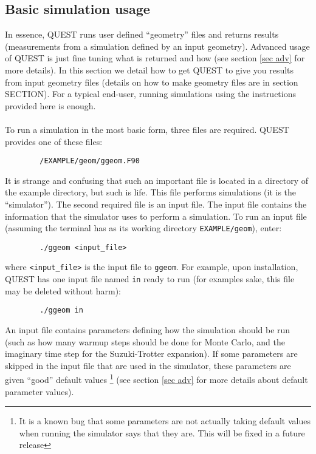 \documentclass[12pt]{article}
\begin{document}
    \subsection{Basic simulation usage}\label{sec basic sim use}
        In essence, QUEST runs user defined ``geometry'' files and returns results (measurements from a simulation defined by an input geometry).
        Advanced usage of QUEST is just fine tuning what is returned and how (see section \ref{sec adv} for more details).
        In this section we detail how to get QUEST to give you results from input geometry files (details on how to make geometry files are in section SECTION). 
        For a typical end-user, running simulations using the instructions provided here is enough. \\
        \\
        \noindent To run a simulation in the most basic form, three files are required.
        QUEST provides one of these files:
        \begin{verbatim}
        /EXAMPLE/geom/ggeom.F90
        \end{verbatim}
        It is strange and confusing that such an important file is located in a directory of the example directory, but such is life.
        This file performs simulations (it is the ``simulator'').
        The second required file is an input file.
        The input file contains the information that the simulator uses to perform a simulation.
        To run an input file (assuming the terminal has as its working directory \texttt{EXAMPLE/geom}), enter:
        \begin{verbatim}
        ./ggeom <input_file>
        \end{verbatim}
        where \texttt{<input\_file>} is the input file to \texttt{ggeom}.
        For example, upon installation, QUEST has one input file named \texttt{in} ready to run (for examples sake, this file may be deleted without harm):
        \begin{verbatim}
        ./ggeom in
        \end{verbatim}
        An input file contains parameters defining how the simulation should be run (such as how many warmup steps should be done for Monte Carlo, and the imaginary time step for the Suzuki-Trotter expansion).
        If some parameters are skipped in the input file that are used in the simulator, these parameters are given ``good'' default values \footnote{It is a known bug that some parameters are not actually taking default values when running the simulator says that they are. This will be fixed in a future release} (see section \ref{sec adv} for more details about default parameter values).
\end{document}
